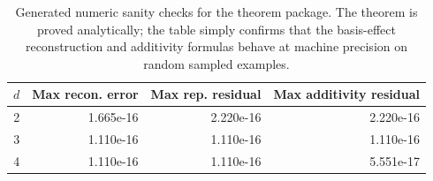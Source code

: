 \begin{table}[t]
\centering
\small
\caption{Generated numeric sanity checks for the theorem package. The theorem is proved analytically; the table simply confirms that the basis-effect reconstruction and additivity formulas behave at machine precision on random sampled examples.}
\label{tab:numeric-checks}
\begin{tabular}{rrrr}
\toprule
$d$ & Max recon. error & Max rep. residual & Max additivity residual \\
\midrule
2 & 1.665e-16 & 2.220e-16 & 2.220e-16 \\
3 & 1.110e-16 & 1.110e-16 & 1.110e-16 \\
4 & 1.110e-16 & 1.110e-16 & 5.551e-17 \\
\bottomrule
\end{tabular}
\end{table}
